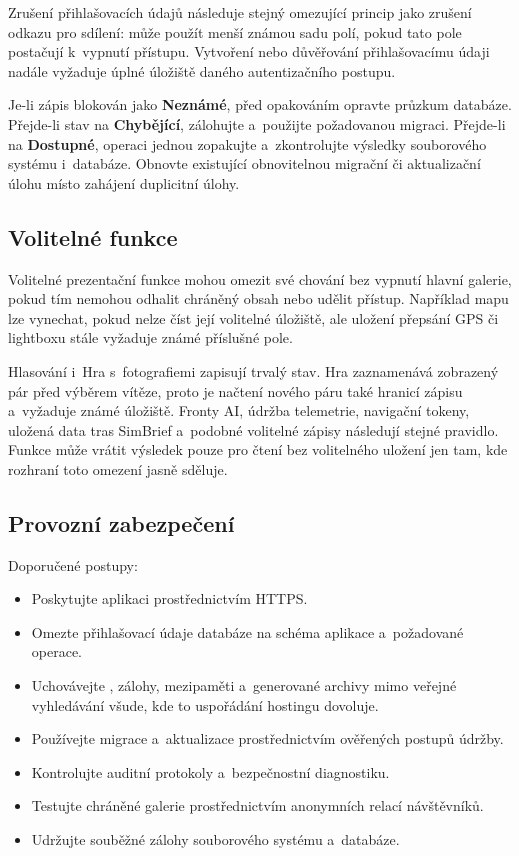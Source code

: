 \documentclass[11pt,a4paper]{article}
\newcommand{\filepath}[1]{\path{#1}}
\newcommand{\ui}[1]{\textbf{#1}}
\begin{document}
Zrušení přihlašovacích údajů následuje stejný omezující princip jako zrušení
odkazu pro sdílení: může použít menší známou sadu polí, pokud tato pole
postačují k~vypnutí přístupu. Vytvoření nebo důvěřování přihlašovacímu údaji
nadále vyžaduje úplné úložiště daného autentizačního postupu.

Je-li zápis blokován jako \ui{Neznámé}, před opakováním opravte průzkum
databáze. Přejde-li stav na \ui{Chybějící}, zálohujte a~použijte požadovanou
migraci. Přejde-li na \ui{Dostupné}, operaci jednou zopakujte a~zkontrolujte
výsledky souborového systému i~databáze. Obnovte existující obnovitelnou
migrační či aktualizační úlohu místo zahájení duplicitní úlohy.

\subsection{Volitelné funkce}

Volitelné prezentační funkce mohou omezit své chování bez vypnutí hlavní
galerie, pokud tím nemohou odhalit chráněný obsah nebo udělit přístup. Například
mapu lze vynechat, pokud nelze číst její volitelné úložiště, ale uložení
přepsání GPS či lightboxu stále vyžaduje známé příslušné pole.

Hlasování i~Hra s~fotografiemi zapisují trvalý stav. Hra zaznamenává zobrazený
pár před výběrem vítěze, proto je načtení nového páru také hranicí zápisu
a~vyžaduje známé úložiště. Fronty AI, údržba telemetrie, navigační tokeny,
uložená data tras SimBrief a~podobné volitelné zápisy následují stejné pravidlo.
Funkce může vrátit výsledek pouze pro čtení bez volitelného uložení jen tam, kde
rozhraní toto omezení jasně sděluje.

\subsection{Provozní zabezpečení}

Doporučené postupy:

\begin{itemize}
  \item Poskytujte aplikaci prostřednictvím HTTPS.
  \item Omezte přihlašovací údaje databáze na schéma aplikace a~požadované
  operace.
  \item Uchovávejte \filepath{config.php}, zálohy, mezipaměti a~generované
  archivy mimo veřejné vyhledávání všude, kde to uspořádání hostingu dovoluje.
  \item Používejte migrace a~aktualizace prostřednictvím ověřených postupů
  údržby.
  \item Kontrolujte auditní protokoly a~bezpečnostní diagnostiku.
  \item Testujte chráněné galerie prostřednictvím anonymních relací návštěvníků.
  \item Udržujte souběžné zálohy souborového systému a~databáze.
\end{itemize}
\end{document}
